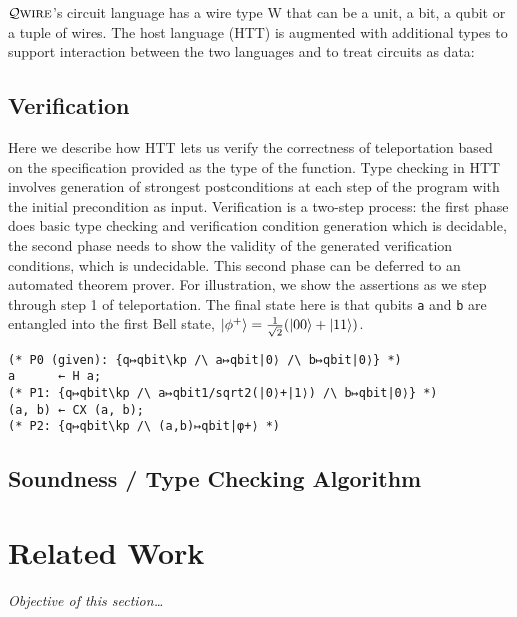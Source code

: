 \documentclass[acmsmall,nonacm,timestamp,review]{acmart}
\newcommand{\qwire}{\ensuremath{\mathcal{Q}\textsc{wire}}\xspace}
\begin{document}
\qwire's circuit language has a wire type W that can be a unit, a bit, a qubit or a tuple of wires. The host language (HTT) is augmented with additional types to support interaction between the two languages and to treat circuits as data:

\subsection{Verification}
Here we describe how HTT lets us verify the correctness of teleportation based on the specification provided as the type of the function. Type checking in HTT involves generation of strongest postconditions at each step of the program with the initial precondition as input. Verification is a two-step process: the first phase does basic type checking and verification condition generation which is decidable, the second phase needs to show the validity of the generated verification conditions, which is undecidable. This second phase can be deferred to an automated theorem prover. For illustration, we show the assertions as we step through step 1 of teleportation. The final state here is that qubits \lstinline{a} and \lstinline{b} are entangled into the first Bell state, $\ket{\phi^+} = \frac{1}{\sqrt{2}}(\ket{00} + \ket{11})$.

\begin{lstlisting}
(* P0 (given): {q↦qbit\kp /\ a↦qbit|0⟩ /\ b↦qbit|0⟩} *)
a      ← H a;
(* P1: {q↦qbit\kp /\ a↦qbit1/sqrt2(|0⟩+|1⟩) /\ b↦qbit|0⟩} *)
(a, b) ← CX (a, b);
(* P2: {q↦qbit\kp /\ (a,b)↦qbit|φ+⟩ *)
\end{lstlisting}

\subsection{Soundness / Type Checking Algorithm}

\section{Related Work}
\textit{Objective of this section\ldots}
\end{document}
